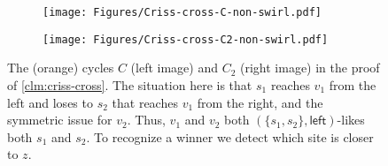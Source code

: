 \documentclass{article}
\newcommand{\leftside}{\mathsf{left}}
\begin{document}
\begin{figure}[ht]
    \centering
    \begin{subfigure}[t]{0.3\textwidth}
        \centering
        \texttt{[image: Figures/Criss-cross-C-non-swirl.pdf]}
               \label{fig:figure1}
    \end{subfigure}
    \hspace{1in}
    \begin{subfigure}[t]{0.3\textwidth}
        \centering
        \texttt{[image: Figures/Criss-cross-C2-non-swirl.pdf]}

        \label{fig:figure2}
    \end{subfigure}
    \caption{The (orange) cycles $C$ (left image) and $C_2$ (right image) in the proof of \cref{clm:criss-cross}.
    The situation here is that $s_1$ reaches $v_1$ from the left and loses to $s_2$ that reaches $v_1$ from the right, and the symmetric issue for $v_2$.
    Thus, $v_1$ and $v_2$ both $(\{s_1,s_2\},\leftside)$-likes both $s_1$ and $s_2$.
    To recognize a winner we detect which site is closer to $z$.}
    \label{fig:criss-cross}
\end{figure}
\end{document}
